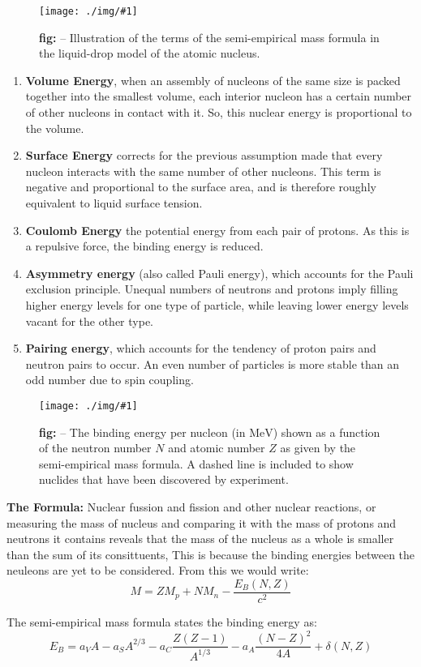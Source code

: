 \documentclass[10pt,a4paper]{article}
\newcounter{figurecounter}
\newcommand{\img}[3]{
    \begin{figure}[h!]
        \centering
        \captionsetup{justification=centering,margin=0.5cm,labelformat=empty}
        \texttt{[image: ./img/\#1]}
        \label{figure}
        \caption{\small\textbf{fig: \thefigurecounter} -- \textcolor{darkliver}{#3}}
    \end{figure}
    \addtocounter{figurecounter}{1}}
\newcommand{\mev}{\text{MeV}}
\begin{document}
\img{liquiddropmodel}{0.7}{Illustration of the terms of the semi-empirical mass formula in the liquid-drop model of the atomic nucleus.}

\begin{enumerate}
    \item \textbf{Volume Energy}, when an assembly of nucleons of the same size is packed together into the smallest volume, each interior nucleon has a certain number of other nucleons in contact with it. So, this nuclear energy is proportional to the volume.
    \item \textbf{Surface Energy} corrects for the previous assumption made that every nucleon interacts with the same number of other nucleons. This term is negative and proportional to the surface area, and is therefore roughly equivalent to liquid surface tension.
    \item \textbf{Coulomb Energy} the potential energy from each pair of protons. As this is a repulsive force, the binding energy is reduced.
    \item \textbf{Asymmetry energy} (also called Pauli energy), which accounts for the Pauli exclusion principle. Unequal numbers of neutrons and protons imply filling higher energy levels for one type of particle, while leaving lower energy levels vacant for the other type.
    \item \textbf{Pairing energy}, which accounts for the tendency of proton pairs and neutron pairs to occur. An even number of particles is more stable than an odd number due to spin coupling.
\end{enumerate}

\img{bindingenergies}{0.5}{The binding energy per nucleon (in $\mev$) shown as a function of the neutron number $N$ and atomic number $Z$ as given by the semi-empirical mass formula. A dashed line is included to show nuclides that have been discovered by experiment.}

\textbf{The Formula:} Nuclear fussion and fission and other nuclear reactions, or measuring the mass of nucleus and comparing it with the mass of protons and neutrons it contains reveals that the mass of the nucleus as a whole is smaller than the sum of its consittuents, This is because the binding energies between the neuleons are yet to be considered. From this we would write:
\begin{equation}
    M = ZM_p + NM_n - \frac{E_B(N,Z)}{c^2}
\end{equation}

The semi-empirical mass formula states the binding energy as:
\begin{equation}
    E_B = a_V A - a_S A^{2/3} - a_C\frac{Z(Z-1)}{A^{1/3}}-a_A\frac{(N-Z)^2}{4A} +\delta(N,Z)
\end{equation}
\end{document}
